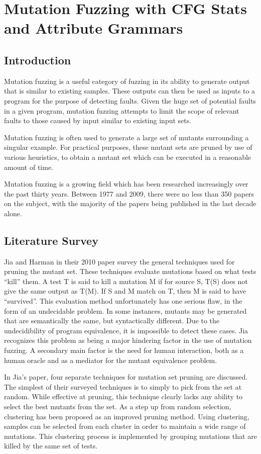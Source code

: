 \section{Mutation Fuzzing with CFG Stats and Attribute Grammars}

\subsection{Introduction}
Mutation fuzzing is a useful category of fuzzing in its ability to
generate output that is similar to existing samples. These outputs can
then be used as inputs to a program for the purpose of detecting
faults. Given the huge set of potential faults in a given program,
mutation fuzzing attempts to limit the scope of relevant faults to
those caused by input similar to existing input sets.

Mutation fuzzing is often used to generate a large set of mutants
surrounding a singular example. For practical purposes, these mutant
sets are pruned by use of various heuristics, to obtain a mutant set
which can be executed in a reasonable amount of time.

Mutation fuzzing is a growing field which has been researched
increasingly over the past thirty years. Between 1977 and 2009, there
were no less than 350 papers on the subject, with the majority of the
papers being published in the last decade alone. \cite{Jia2010}

\subsection{Literature Survey}
Jia and Harman in their 2010 paper survey the general techniques used
for pruning the mutant set.\cite{Jia2010} These techniques evaluate
mutations based on what tests ``kill'' them. A test T is said to kill
a mutation M if for source S, T(S) does not give the same output as
T(M). If S and M match on T, then M is said to have ``survived''. This
evaluation method unfortunately has one serious flaw, in the form of
an undecidable problem. In some instances, mutants may be generated
that are semantically the same, but syntactically different. Due to
the undecidibility of program equivalence, it is impossible to detect
these cases. Jia recognizes this problem as being a major hindering
factor in the use of mutation fuzzing. A secondary main factor is the
need for human interaction, both as a human oracle and as a mediator
for the mutant equivalence problem.

In Jia's paper, four separate techniques for mutation set pruning are
discussed. The simplest of their surveyed techniques is to simply to
pick from the set at random. While effective at pruning, this
technique clearly lacks any ability to select the best mutants from
the set. As a step up from random selection, clustering has been
proposed as an improved pruning method. Using clustering, samples can
be selected from each cluster in order to maintain a wide range of
mutations. This clustering process is implemented by grouping
mutations that are killed by the same set of tests.

